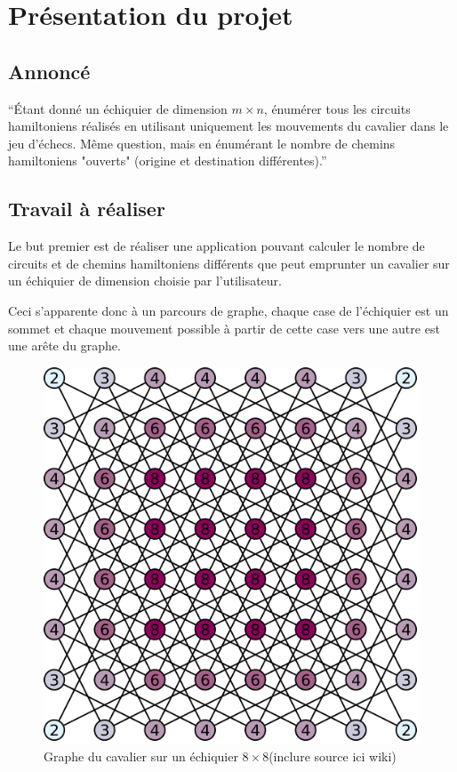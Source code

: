 \section{Présentation du projet}

\subsection{Annoncé}
\enquote{Étant donné un échiquier de dimension $m \times n$, énumérer tous les circuits hamiltoniens réalisés en utilisant uniquement les mouvements du cavalier dans le jeu d'échecs. Même question, mais en énumérant le nombre de chemins hamiltoniens "ouverts" (origine et destination différentes).}

\subsection{Travail à réaliser}
Le but premier est de réaliser une application pouvant calculer le nombre de circuits et de chemins hamiltoniens différents que peut emprunter un cavalier sur un échiquier de dimension choisie par l'utilisateur.

Ceci s'apparente donc à un parcours de graphe, chaque case de l'échiquier est un sommet et chaque mouvement possible à partir de cette case vers une autre est une arête du graphe.

\begin{figure}[h]
\begin{center}
   \includegraphics[scale=0.25]{img/graph_cavalier.png} 
   \caption{\label{cavalier_graphe} Graphe du cavalier sur un échiquier $8 \times 8$(inclure source ici wiki)}
   \end{center}
\end{figure}

